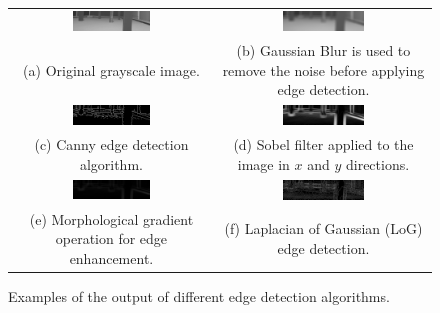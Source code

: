 \begin{figure}[htbp]
  \centering
  \tabulinesep=1.2mm
  \begin{tabu}{cc}
    \includegraphics[width=0.4\textwidth]{Images/EdgeDetection/original.png} & \includegraphics[width=0.4\textwidth]{Images/EdgeDetection/blurred.png} \\
    \parbox{0.4\textwidth}{\centering (a) Original grayscale image.} &
    \parbox{0.4\textwidth}{\centering (b) Gaussian Blur is used to remove the noise before applying edge detection.} \\
    \includegraphics[width=0.4\textwidth]{Images/EdgeDetection/canny_edges.png} & \includegraphics[width=0.4\textwidth]{Images/EdgeDetection/sobel_edges.png} \\
    \parbox{0.4\textwidth}{\centering (c) Canny edge detection algorithm.} &
    \parbox{0.4\textwidth}{\centering (d) Sobel filter applied to the image in $x$ and $y$ directions.} \\
    \includegraphics[width=0.4\textwidth]{Images/EdgeDetection/morphological_edges.png} & \includegraphics[width=0.4\textwidth]{Images/EdgeDetection/log_edges.png} \\
    \parbox{0.4\textwidth}{\centering (e) Morphological gradient operation for edge enhancement.} &
    \parbox{0.4\textwidth}{\centering (f) Laplacian of Gaussian (LoG) edge detection.} \\
  \end{tabu}
  \caption{Examples of the output of different edge detection algorithms.}
\end{figure}

